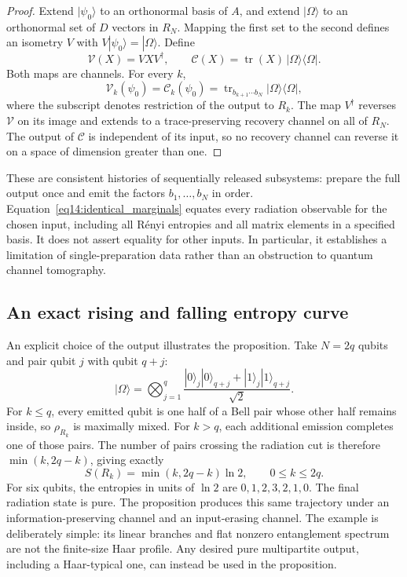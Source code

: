 \documentclass[11pt,letterpaper]{article}
\theoremstyle{plain}
\theoremstyle{definition}
\theoremstyle{remark}
\newcommand{\Ccal}{\mathcal{C}}
\newcommand{\Vcal}{\mathcal{V}}
\DeclareMathOperator{\tr}{tr}
\begin{document}
\begin{proof}
Extend $|\psi_0\rangle$ to an orthonormal basis of $A$, and extend
$|\Omega\rangle$ to an orthonormal set of $D$ vectors in $R_N$. Mapping
the first set to the second defines an isometry $V$ with
$V|\psi_0\rangle=|\Omega\rangle$. Define
\begin{equation}
 \Vcal(X)=VXV^\dagger,\qquad
 \Ccal(X)=\tr(X)\,|\Omega\rangle\langle\Omega|.
 \label{eq14:two_channels}
\end{equation}
Both maps are channels. For every $k$,
\begin{equation}
 \Vcal_k(\psi_0)=\Ccal_k(\psi_0)
 =\tr_{b_{k+1}\cdots b_N}|\Omega\rangle\langle\Omega|,
 \label{eq14:identical_marginals}
\end{equation}
where the subscript denotes restriction of the output to $R_k$.
The map $V^\dagger$ reverses $\Vcal$ on its image and extends to a
trace-preserving recovery channel on all of $R_N$. The output of
$\Ccal$ is independent of its input, so no recovery channel can reverse
it on a space of dimension greater than one.
\end{proof}

These are consistent histories of sequentially released subsystems:
prepare the full output once and emit the factors $b_1,\ldots,b_N$ in
order. Equation~\eqref{eq14:identical_marginals} equates every radiation
observable for the chosen input, including all R\'enyi entropies and
all matrix elements in a specified basis. It does not assert equality for
other inputs. In particular, it establishes a limitation of
single-preparation data rather than an obstruction to quantum channel
tomography.

\subsection{An exact rising and falling entropy curve}
\label{subsec14:bell_example}

An explicit choice of the output illustrates the proposition. Take
$N=2q$ qubits and pair qubit $j$ with qubit $q+j$:
\begin{equation}
 |\Omega\rangle
 =\bigotimes_{j=1}^{q}
 \frac{|0\rangle_j|0\rangle_{q+j}
       +|1\rangle_j|1\rangle_{q+j}}{\sqrt2}.
 \label{eq14:bell_output}
\end{equation}
For $k\leq q$, every emitted qubit is one half of a Bell pair whose
other half remains inside, so $\rho_{R_k}$ is maximally mixed. For
$k>q$, each additional emission completes one of those pairs. The
number of pairs crossing the radiation cut is therefore
$\min(k,2q-k)$, giving exactly
\begin{equation}
 S(R_k)=\min(k,2q-k)\ln2,\qquad 0\leq k\leq2q.
 \label{eq14:bell_curve}
\end{equation}
For six qubits, the entropies in units of $\ln2$ are
$0,1,2,3,2,1,0$. The final radiation state is pure. The proposition
produces this same trajectory under an information-preserving channel
and an input-erasing channel. The example is deliberately simple: its
linear branches and flat nonzero entanglement spectrum are not the
finite-size Haar profile. Any desired pure multipartite output,
including a Haar-typical one, can instead be used in the proposition.
\end{document}
